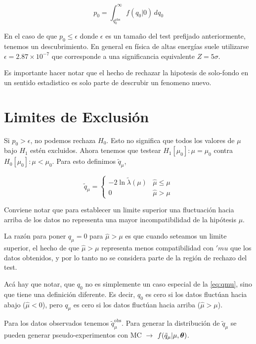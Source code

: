 \begin{equation}
  p_0 = \int_{q_{0}^\text{obs}}^{\infty} f(q_0|0) \, dq_0
  \label{eq:p0}
\end{equation}

En el caso de que $p_0 \leq \epsilon$ donde $\epsilon$ es un tamaño del test
prefijado anteriormente, tenemos un descubrimiento. En general en física
de altas energías suele utilizarse $\epsilon = 2.87 \times 10^{-7}$ que corresponde
a una significancia equivalente $Z=5\sigma$.

Es importante hacer notar que el hecho de rechazar la hipotesis de solo-fondo en
un sentido estadistico es solo parte de descrubir un fenomeno nuevo.


\section{Limites de Exclusión}

Si $p_0> \epsilon$, no podemos rechaza $H_0$. Esto no significa que todos los valores de
$\mu$ bajo $H_1$ estén excluidos. Ahora tenemos que testear $H_1[\mu_0]: \mu = \mu_0$ contra
$H_0[\mu_0]: \mu < \mu_0$. Para esto definimos $\tilde{q}_\mu$,

\begin{equation}
  \tilde{q}_\mu =
  \begin{cases}
    -2 \ln \tilde{\lambda}(\mu) & \hat{\mu} \leq \mu \\
    0 & \hat{\mu} > \mu
  \end{cases} \label{eq:qmu}
\end{equation}

Conviene notar que para establecer un limite superior una fluctuación hacia arriba
de los datos no representa una mayor incompatibilidad de la hipótesis $\mu$.

La razón para poner $q_\mu = 0$ para $\hat{\mu} > \mu$ es que cuando seteamos un limite
superior, el hecho de que $\hat{\mu} > \mu$ representa menos compatibilidad con $'mu$ que
los datos obtenidos, y por lo tanto no se considera parte de la región de rechazo del test.

Acá hay que notar, que $q_0$ no es simplemente un caso especial de la {\eq} \eqref{eq:qmu},
sino que tiene una definición diferente. Es decir, $q_0$ es cero si los datos fluctúan
hacia abajo ($\hat{\mu}<0$), pero $q_\mu$ es cero si los datos fluctúan hacia arriba ($\hat{\mu}>\mu$).

Para los datos observados tenemos $\tilde{q}_\mu^\text{obs}$. Para generar la distribución de $\tilde{q}_\mu$
se pueden generar pseudo-experimentos con MC $\to$ $f(\tilde{q}_\mu|\mu, \bm{\theta})$.

